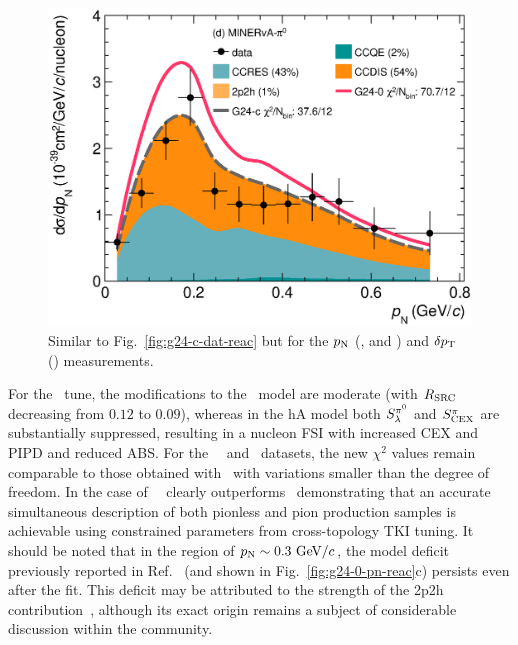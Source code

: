 \begin{figure}
        \includegraphics[width=\dbfigwid\textwidth]{figures/tuning/0026-min_pi0_pn_reac_decomp_covfix.eps}
        \caption{\label{fig:g24-c-pn-reac}  
        Similar to Fig.~\ref{fig:g24-c-dat-reac} but for the $p_\textrm{N}$ (\ttkpip, \minzpi and \minpiz) and $\delta p_\textrm{T}$ (\ttkzpi) measurements. 
        } 
    \end{figure}

    For the \gC\ tune, the modifications to the \sfcfg\ model are moderate (with $R_\textrm{SRC}$ decreasing from $0.12$ to $0.09$), whereas in the hA model both $S_\lambda^{\pi^{0}}$ and $S_\textrm{CEX}^{\pi}$ are substantially suppressed, resulting in a nucleon FSI with increased CEX and PIPD and reduced ABS.  
    For the \ttkzpi\, \ttkpip\, and \minzpi\ datasets, the new $\chi^2$ values remain comparable to those obtained with \gZero\, with variations smaller than the degree of freedom. 
    In the case of \minpiz\, \gC\ clearly outperforms \gZero\, demonstrating that an accurate simultaneous description of both pionless and pion production samples is achievable using constrained parameters from cross-topology TKI tuning. 
    It should be noted that in the region of $p_\textrm{N}\sim0.3~\textrm{GeV}/c$, the model deficit previously reported in Ref.~\cite{MINERvA:2018hba} (and shown in Fig.~\ref{fig:g24-0-pn-reac}c) persists even after the fit. 
    This deficit may be attributed to the strength of the 2p2h contribution~\cite{MINERvA:2018hba}, although its exact origin remains a subject of considerable discussion within the community.

